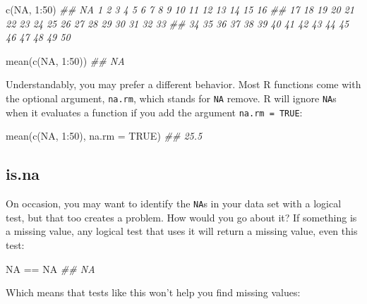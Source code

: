 \documentclass[
  letterpaper,
  DIV=11,
  numbers=noendperiod]{scrbook}
\newenvironment{Shaded}{\begin{snugshade}}{\end{snugshade}}
\newcommand{\AttributeTok}[1]{\textcolor[rgb]{0.40,0.45,0.13}{#1}}
\newcommand{\ConstantTok}[1]{\textcolor[rgb]{0.56,0.35,0.01}{#1}}
\newcommand{\DecValTok}[1]{\textcolor[rgb]{0.68,0.00,0.00}{#1}}
\newcommand{\DocumentationTok}[1]{\textcolor[rgb]{0.37,0.37,0.37}{\textit{#1}}}
\newcommand{\FunctionTok}[1]{\textcolor[rgb]{0.28,0.35,0.67}{#1}}
\newcommand{\NormalTok}[1]{\textcolor[rgb]{0.00,0.23,0.31}{#1}}
\newcommand{\SpecialCharTok}[1]{\textcolor[rgb]{0.37,0.37,0.37}{#1}}
\begin{document}
\begin{Shaded}
\begin{Highlighting}[]
\FunctionTok{c}\NormalTok{(}\ConstantTok{NA}\NormalTok{, }\DecValTok{1}\SpecialCharTok{:}\DecValTok{50}\NormalTok{)}
\DocumentationTok{\#\# NA  1  2  3  4  5  6  7  8  9 10 11 12 13 14 15 16}
\DocumentationTok{\#\# 17 18 19 20 21 22 23 24 25 26 27 28 29 30 31 32 33}
\DocumentationTok{\#\# 34 35 36 37 38 39 40 41 42 43 44 45 46 47 48 49 50}

\FunctionTok{mean}\NormalTok{(}\FunctionTok{c}\NormalTok{(}\ConstantTok{NA}\NormalTok{, }\DecValTok{1}\SpecialCharTok{:}\DecValTok{50}\NormalTok{))}
\DocumentationTok{\#\# NA}
\end{Highlighting}
\end{Shaded}

Understandably, you may prefer a different behavior. Most R functions
come with the optional argument, \texttt{na.rm}, which stands for
\texttt{NA} remove. R will ignore \texttt{NA}s when it evaluates a
function if you add the argument \texttt{na.rm\ =\ TRUE}:

\begin{Shaded}
\begin{Highlighting}[]
\FunctionTok{mean}\NormalTok{(}\FunctionTok{c}\NormalTok{(}\ConstantTok{NA}\NormalTok{, }\DecValTok{1}\SpecialCharTok{:}\DecValTok{50}\NormalTok{), }\AttributeTok{na.rm =} \ConstantTok{TRUE}\NormalTok{)}
\DocumentationTok{\#\# 25.5}
\end{Highlighting}
\end{Shaded}

\subsection{is.na}\label{is.na}

On occasion, you may want to identify the \texttt{NA}s in your data set
with a logical test, but that too creates a problem. How would you go
about it? If something is a missing value, any logical test that uses it
will return a missing value, even this test:

\begin{Shaded}
\begin{Highlighting}[]
\ConstantTok{NA} \SpecialCharTok{==} \ConstantTok{NA}
\DocumentationTok{\#\# NA}
\end{Highlighting}
\end{Shaded}

Which means that tests like this won't help you find missing values:
\end{document}
